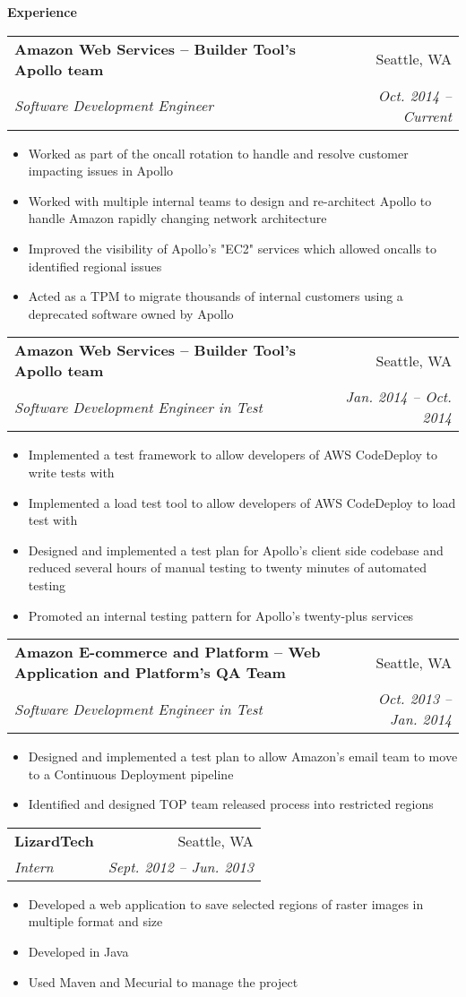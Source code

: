 \documentclass[letterpaper,11pt]{article}
\makeatletter
\newcommand{\resitem}[1]{\item #1 \vspace{-2pt}}
\newcommand{\resheading}[1]{{\large \colorbox{mygrey}{\begin{minipage}{\textwidth}{\textbf{#1 \vphantom{p\^{E}}}}\end{minipage}}}}
\newcommand{\ressubheading}[4]{
\begin{tabular*}{6.5in}{l@{\extracolsep{\fill}}r}
		\textbf{#1} & #2 \\
		\textit{#3} & \textit{#4} \\
\end{tabular*}\vspace{-6pt}}
\makeatother
\begin{document}
\resheading{Experience}
	\begin{description}
		 {\footnotesize 
			\item \ressubheading{{Amazon Web Services -- Builder Tool's Apollo team }}{Seattle, WA}{Software Development Engineer}{Oct. 2014 -- Current}
				\begin{itemize}
					\resitem{Worked as part of the oncall rotation to handle and resolve customer impacting issues in Apollo}
					\resitem{Worked with multiple internal teams to design and re-architect Apollo to handle Amazon rapidly changing network architecture  }					
					\resitem{Improved the visibility of Apollo's "EC2" services which allowed oncalls to identified regional issues }
					\resitem{Acted as a TPM to migrate thousands of internal customers using a deprecated software owned by Apollo }
				\end{itemize}
			\item \ressubheading{{Amazon Web Services -- Builder Tool's Apollo team }}{Seattle, WA}{Software Development Engineer in Test}{Jan. 2014 -- Oct. 2014}
				\begin{itemize}
					\resitem{Implemented a test framework to allow developers of AWS CodeDeploy to write tests with}
					\resitem{Implemented a load test tool to allow developers of AWS CodeDeploy to load test with}
					\resitem{Designed and implemented a test plan for Apollo's client side codebase and reduced several hours of manual testing to twenty minutes of automated testing}
					\resitem{Promoted an internal testing pattern for Apollo's twenty-plus services}
				\end{itemize}
			\item \ressubheading{{Amazon E-commerce and Platform -- Web Application and Platform's QA Team}}{Seattle, WA}{Software Development Engineer in Test}{Oct. 2013 -- Jan. 2014}
				\begin{itemize}
					\resitem{Designed and implemented a test plan to allow Amazon's email team to move to a Continuous Deployment pipeline }
					\resitem{Identified and designed TOP team released process into restricted regions}
				\end{itemize}
			\item \ressubheading{{LizardTech }}{Seattle, WA}{Intern}{Sept. 2012 -- Jun. 2013}
				\begin{itemize}
					\resitem{Developed a web application to save selected regions of raster images in multiple format and size}
					\resitem{Developed in Java}
					\resitem{Used Maven and Mecurial to manage the project}
				\end{itemize}
			}



	\end{description} %
	
\end{document}
